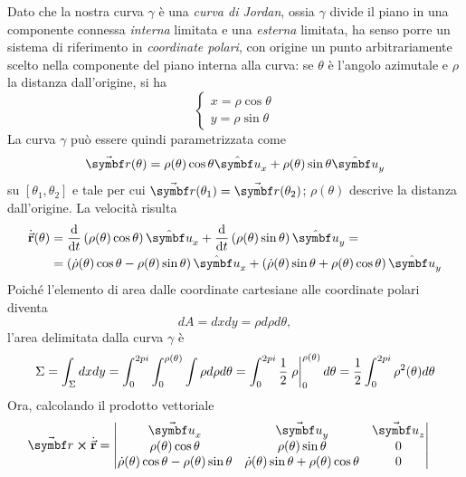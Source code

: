 \begin{demonstration}
	Dato che la nostra curva $\gamma$ è una \textit{curva di Jordan}, ossia $\gamma$ divide il piano in una componente connessa \textit{interna} limitata e una \textit{esterna} limitata, ha senso porre un sistema di riferimento in \textit{coordinate polari}, con origine un punto arbitrariamente scelto nella componente del piano interna alla curva: se $\theta$ è l'angolo azimutale e $\rho$ la distanza dall'origine, si ha
	\begin{equation*}
		\begin{cases}
			x=\rho \cos\theta\\
			y=\rho \sin\theta
		\end{cases}
	\end{equation*}
	La curva $\gamma$ può essere quindi parametrizzata come 
	\begin{equation*}
		\vba{r}(\theta)=\rho(\theta)\cos \theta\vbh{u}_x+\rho(\theta)\sin \theta\vbh{u}_y
	\end{equation*}
	su $\left[\theta_1,\theta_2\right]$ e tale per cui $\vba{r}(\theta_1)=\vba{r}(\theta_2)$; $\rho(\theta)$ descrive la distanza dall'origine. La velocità risulta
	\begin{align*}
		\vbd{r}(\theta)&=\dv{t}\left(\rho(\theta)\cos \theta\right)\vbh{u}_x+\dv{t}\left(\rho(\theta)\sin \theta\right)\vbh{u}_y=\\
		&=\left(\dot{\rho}(\theta)\cos \theta-\rho(\theta)\sin \theta\right)\vbh{u}_x+\left(\dot{\rho}(\theta)\sin \theta+\rho(\theta)\cos \theta\right)\vbh{u}_y
	\end{align*}
	Poiché l'elemento di area dalle coordinate cartesiane alle coordinate polari diventa
	\begin{equation*}
		dA=dxdy=\rho d\rho d\theta,
	\end{equation*}
	l'area delimitata dalla curva $\gamma$ è
	\begin{equation*}
		\Sigma=\int_{\Sigma}dxdy=\int_{0}^{2pi}\int_{0}^{\rho(\theta)}\int \rho d\rho d\theta= \int_{0}^{2pi}\frac{1}{2}\eval{\rho}_{0}^{\rho(\theta)} d\theta=\frac{1}{2}\int_{0}^{2pi}\rho^2(\theta)d\theta
	\end{equation*}
	Ora, calcolando il prodotto vettoriale 
	\begin{align*}
		\vba{r}\cross\vbd{r}&=
		\begin{vmatrix}
			\vba{u}_x & \vba{u}_y & \vba{u}_z\\
			\rho(\theta)\cos \theta & \rho(\theta)\sin \theta & 0\\
			\dot{\rho}(\theta)\cos \theta-\rho(\theta)\sin \theta & \dot{\rho}(\theta)\sin \theta+\rho(\theta)\cos \theta & 0

\end{vmatrix}
\end{align*}
\end{demonstration}
